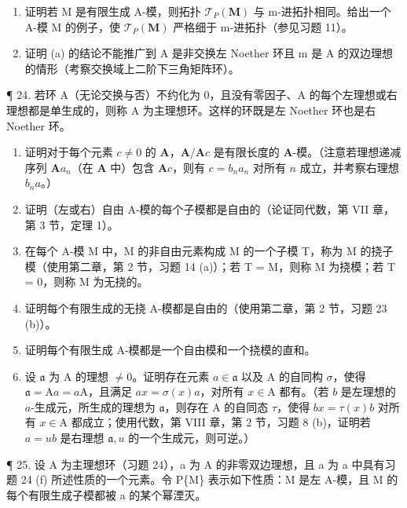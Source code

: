 \begin{enumerate}
\def\labelenumi{(\alph{enumi})}
\setcounter{enumi}{1}
\item
  证明若 M 是有限生成 A-模，则拓扑 \(\mathcal{T}_{P}(\mathbf{M})\) 与 m-进拓扑相同。给出一个 A-模 M 的例子，使 \(\mathcal{T}_{P}(\mathbf{M})\) 严格细于 m-进拓扑（参见习题 11）。~
\item
  证明 (a) 的结论不能推广到 A 是非交换左 Noether 环且 m 是 A 的双边理想的情形（考察交换域上二阶下三角矩阵环）。
\end{enumerate}

¶ 24. 若环 A（无论交换与否）不约化为 0，且没有零因子、A 的每个左理想或右理想都是单生成的，则称 A 为主理想环。这样的环既是左 Noether 环也是右 Noether 环。

\begin{enumerate}
\def\labelenumi{(\alph{enumi})}
\item
   证明对于每个元素 \(c \neq 0\) 的 \(\mathbf{A}\)，\(\mathbf{A} / \mathbf{A}c\) 是有限长度的 \(\mathbf{A}\)-模。（注意若理想递减序列 \(\mathbf{A}a_n\)（在 \(\mathbf{A}\) 中）包含 \(\mathbf{A}c\)，则有 \(c = b_na_n\) 对所有 \(n\) 成立，并考察右理想 \(b_na\)。）
\item
  证明（左或右）自由 A-模的每个子模都是自由的（论证同代数，第 VII 章，第 3 节，定理 1）。
\item
  在每个 A-模 M 中，M 的非自由元素构成 M 的一个子模 T，称为 M 的挠子模（使用第二章，第 2 节，习题 14 (a)）；若 T = M，则称 M 为挠模；若 T = 0，则称 M 为无挠的。
\item
  证明每个有限生成的无挠 A-模都是自由的（使用第二章，第 2 节，习题 23 (b)）。
\item
  证明每个有限生成 A-模都是一个自由模和一个挠模的直和。
\item
   设 \(\mathfrak{a}\) 为 A 的理想 \(\neq 0\)。证明存在元素 \(a \in \mathfrak{a}\) 以及 A 的自同构 \(\sigma\)，使得 \(\mathfrak{a} = \mathrm{A}a = a\mathrm{A}\)，且满足 \(ax = \sigma(x)a\)，对所有 \(x \in \mathrm{A}\) 都有。（若 \(b\) 是左理想的 \(a\)-生成元，所生成的理想为 \(\mathfrak{a}\)，则存在 A 的自同态 \(\tau\)，使得 \(bx = \tau(x)b\) 对所有 \(x \in \mathrm{A}\) 都成立；使用代数，第 VIII 章，第 2 节，习题 8 (b)，证明若 \(a = ub\) 是右理想 \(\mathfrak{a}, u\) 的一个生成元，则可逆。）
\end{enumerate}

¶ 25. 设 A 为主理想环（习题 24），a 为 A 的非零双边理想，且 a 为 a 中具有习题 24 (f) 所述性质的一个元素。令 P\{M\} 表示如下性质：M 是左 A-模，且 M 的每个有限生成子模都被 a 的某个幂湮灭。

